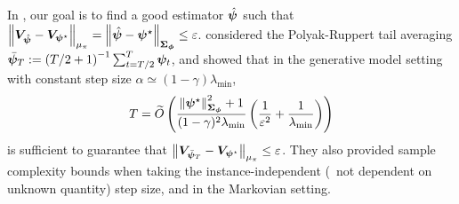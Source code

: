 In {\LTD}, our goal is to find a good estimator $\hat{{\bm{\psi}}}$ such that $\left\|{{\bm{V}}_{\hat{{\bm{\psi}}}}-{\bm{V}}_{{\bm{\psi}}^\star}}\right\|_{\mu_\pi}=\left\|{\hat{{\bm{\psi}}}-{\bm{\psi}}^\star}\right\|_{{\bm{\Sigma}}_{{\bm{\phi}}}}\leq \varepsilon$.
\cite{samsonov2024improved} considered the Polyak-Ruppert tail averaging $\bar{{\bm{\psi}}}_{T}:=\left({T/2+1}\right)^{-1}\sum_{t=T/2}^T{\bm{\psi}}_t$, and showed that in the generative model setting
with constant step size $\alpha\simeq (1-\gamma)\lambda_{\min}$, 
\begin{equation*}
   T=\widetilde{O}\left({\frac{\left\|{{\bm{\psi}}^\star}\right\|^2_{{\bm{\Sigma}}_{{\bm{\phi}}}}+1}{(1-\gamma)^2\lambda_{\min}}\left({\frac{1}{\varepsilon^2}+\frac{1}{\lambda_{\min}}}\right)}\right)
\end{equation*}
is sufficient to guarantee that $\left\|{{\bm{V}}_{\bar{{\bm{\psi}}}_{T}}-{\bm{V}}_{{\bm{\psi}}^\star}}\right\|_{\mu_\pi}\leq \varepsilon$.
They also provided sample complexity bounds when taking the instance-independent (\ie\ not dependent on unknown quantity) 
step size, and in the Markovian setting.

